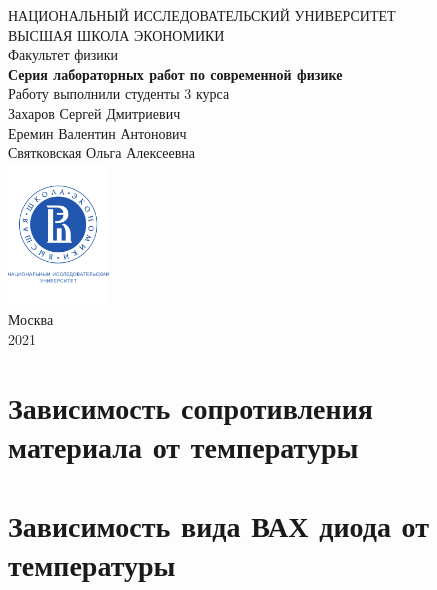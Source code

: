 \documentclass[a4paper, 12pt]{article}
\begin{document}
	\begin{titlepage}
		\begin{center}
			$$$$
			$$$$
			$$$$
			$$$$
			{\Large{НАЦИОНАЛЬНЫЙ ИССЛЕДОВАТЕЛЬСКИЙ УНИВЕРСИТЕТ}}\\
			\vspace{0.1cm}
			{\Large{ВЫСШАЯ ШКОЛА ЭКОНОМИКИ}}\\
			\vspace{0.25cm}
			{\large{Факультет физики}}\\
			\vspace{5.5cm}
			{\Huge\textbf{{Серия лабораторных работ по современной физике}}}\\%
			\vspace{1cm}
			{Работу выполнили студенты 3 курса}\\
			{Захаров Сергей Дмитриевич}\\
			{Еремин Валентин Антонович}\\
			{Святковская Ольга Алексеевна}\\
			\vfill
			\includegraphics[width = 0.2\textwidth]{HSElogo}\\
			\vfill
			Москва\\
			2021
		\end{center}
	\end{titlepage}
	
\tableofcontents

\newpage

\section{Зависимость сопротивления материала от температуры}

\newpage

\section{Зависимость вида ВАХ диода от температуры}
\end{document}
